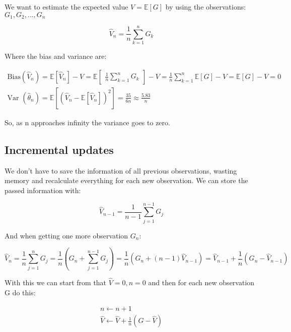 We want to estimate the expected value $V =\mathbb{E}[G]$ by using the observations: $G_1, G_2, \ldots,G_n$

	\begin{equation}
		\hat{V}_n = \frac{1} {n} \sum_{k=1}^{n}G_k
	\end{equation}

Where the bias and variance are: 

	\begin{equation}
	\begin{aligned}
		\text{Bias}(\hat{V}_n) = \mathbb{E}[\hat{V}_n] - V = \mathbb{E} \begin{bmatrix} \frac{1} {n} \sum_{k=1}^{n}G_k  \end{bmatrix} -V = \frac{1} {n} \sum_{k=1}^{n} \mathbb{E}[G] -V = \mathbb{E}[G] -V = 0 \\
		\text{Var }(\hat{\theta}_n) = \mathbb{E} [(\hat{V}_n - \mathbb{E}[\hat{V}_n])^{2}] = \frac{35} {6n} \approx \frac{5.83} {n}   
	\end{aligned}
	\end{equation}

So, as n approaches infinity the variance goes to zero. 

\subsection*{Incremental updates}
We don't have to save the information of all previous observations, wasting memory and recalculate everything for each new observation. We can store the passed information with:

	\begin{equation}
		\hat{V}_{n-1} = \frac{1} {n-1} \sum_{j=1}^{n-1}G_j 
	\end{equation}

And when getting one more observation $G_n$:

	\begin{equation}
		\hat{V}_n = \frac{1} {n} \sum_{j=1}^{n}G_j = \frac{1} {n}(G_n + \sum_{j=1}^{n-1}G_j) = \frac{1} {n}(G_n + (n-1)\hat{V}_{n-1}) = \hat{V}_{n-1} + \frac{1} {n}(G_n - \hat{V}_{n-1})   
	\end{equation}

With this we can start from that $\hat{V} = 0, n = 0$ and then for each new observation G do this:

	\begin{equation}
	\begin{aligned}
		n \leftarrow n+1 \\
		\hat{V} \leftarrow \hat{V} + \frac{1} {n}(G-\hat{V}) 
	\end{aligned}
	\end{equation}

